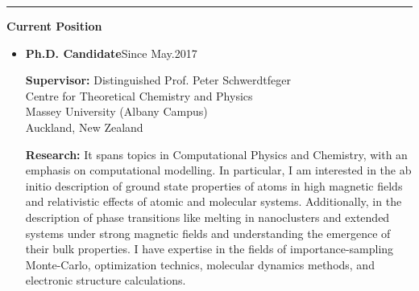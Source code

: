 \documentclass[12pt]{extarticle}
\begin{document}
\begin{minipage}{0.65\columnwidth}
\vspace*{-1mm}
\hspace*{-1.9mm}
\noindent
{\color{gray!20!white} \rule{1.01\linewidth}{3mm} } 

\vspace*{-4mm}



\vspace*{1mm}
{\bf\Large Current \textcolor{azul}{Position}}\\ \vspace*{-6mm}

\begin{itemize}

  \item {\bf Ph.D. Candidate}\hfill \textcolor{azul}{Since May.2017}

  {\bf Supervisor:} Distinguished Prof. Peter Schwerdtfeger\\[2mm]
  Centre for Theoretical Chemistry and Physics\\
  Massey University (Albany Campus)\\
  Auckland, New Zealand

  {\bf Research:}
  It spans topics in Computational Physics and Chemistry, with an emphasis on computational modelling. In particular, I am interested in the ab initio description of ground state properties of atoms in high magnetic fields and relativistic effects of atomic and molecular systems. Additionally, in the description of phase transitions like melting in nanoclusters and extended systems under strong magnetic fields and understanding the emergence of their bulk properties. I have expertise in the fields of importance-sampling Monte-Carlo, optimization technics, molecular dynamics methods, and electronic structure calculations. 
\end{itemize}

\end{minipage}
\end{document}
